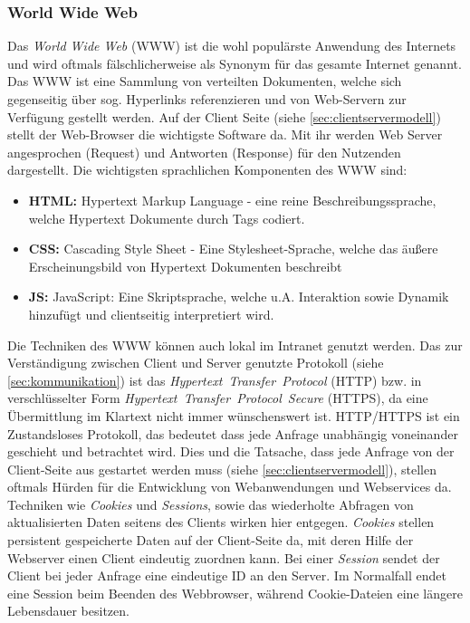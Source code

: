 \subsubsection{World Wide Web}\label{sec:www}
Das \emph{World Wide Web} (WWW) ist die wohl populärste Anwendung des Internets~\cite{Safran2011} und wird oftmals fälschlicherweise als Synonym für das gesamte Internet genannt. Das WWW ist eine Sammlung von verteilten Dokumenten, welche sich gegenseitig über sog. Hyperlinks referenzieren und von Web-Servern zur Verfügung gestellt werden. Auf der Client Seite (siehe \ref{sec:clientservermodell}) stellt der Web-Browser die wichtigste Software da. Mit ihr werden Web Server angesprochen (Request) und Antworten (Response) für den Nutzenden dargestellt. Die wichtigsten sprachlichen Komponenten des WWW sind: \\ 
\begin{itemize}
	\item \textbf{HTML:} Hypertext Markup Language - eine reine Beschreibungssprache, welche Hypertext Dokumente durch Tags codiert. 
	\item \textbf{CSS:} Cascading Style Sheet - Eine Stylesheet-Sprache, welche das äußere Erscheinungsbild von Hypertext Dokumenten beschreibt
	\item \textbf{JS:} JavaScript: Eine Skriptsprache, welche u.A. Interaktion sowie Dynamik hinzufügt und clientseitig interpretiert wird. 
\end{itemize}
Die Techniken des WWW können auch lokal im Intranet genutzt werden. 
Das zur Verständigung zwischen Client und Server genutzte Protokoll (siehe \ref{sec:kommunikation}) ist das \emph{Hypertext~Transfer~Protocol} (HTTP) bzw. in verschlüsselter Form \emph{Hypertext~Transfer~Protocol~Secure} (HTTPS), da eine Übermittlung im Klartext nicht immer wünschenswert ist. HTTP/HTTPS ist ein Zustandsloses Protokoll, das bedeutet dass jede Anfrage unabhängig voneinander geschieht und betrachtet wird. Dies und die Tatsache, dass jede Anfrage von der Client-Seite aus gestartet werden muss (siehe \ref{sec:clientservermodell}), stellen oftmals Hürden für die Entwicklung von Webanwendungen und Webservices da. Techniken wie \emph{Cookies} und \emph{Sessions}, sowie das wiederholte Abfragen von aktualisierten Daten seitens des Clients wirken hier entgegen. \emph{Cookies} stellen persistent gespeicherte Daten auf der Client-Seite da, mit deren Hilfe der Webserver einen Client eindeutig zuordnen kann. Bei einer \emph{Session} sendet der Client bei jeder Anfrage eine eindeutige ID an den Server. Im Normalfall endet eine Session beim Beenden des Webbrowser, während Cookie-Dateien eine längere Lebensdauer besitzen.      
%
